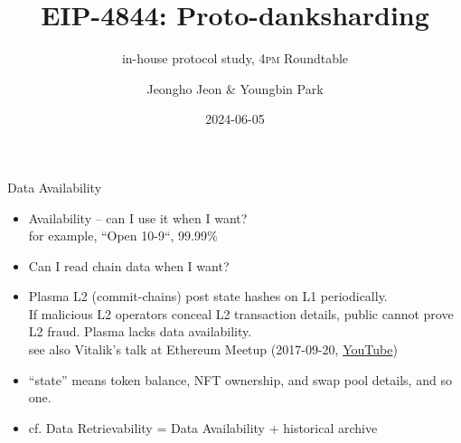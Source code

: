 \documentclass[10pt]{beamer}
\title{EIP-4844: Proto-danksharding}
\subtitle{in-house protocol study, 4\textsc{pm} Roundtable}
\date{2024-06-05}
\author{Jeongho Jeon \& Youngbin Park}
\institute{DSRV (All That Node, WELLDONE Studio)}
\begin{document}
\maketitle

\begin{frame}[fragile]{Data Availability}
\begin{itemize}
  \item Availability -- can I use it when I want? \\
    for example, ``Open 10-9``, 99.99\%
  \item Can I read chain data when I want?
  \item Plasma L2 (commit-chains) post state hashes on L1
    periodically. \\
    If malicious L2 operators conceal L2 transaction
    details, public cannot prove L2 fraud. Plasma lacks
    data availability. \\
    see also Vitalik's talk at Ethereum Meetup (2017-09-20,
    \href{https://www.youtube.com/watch?v=OJT_fR7wexw}{YouTube})
  \item ``state'' means token balance, NFT ownership, and
    swap pool details, and so one.
  \item cf. Data Retrievability = Data Availability +
    historical archive
\end{itemize}
\end{frame}
\end{document}
